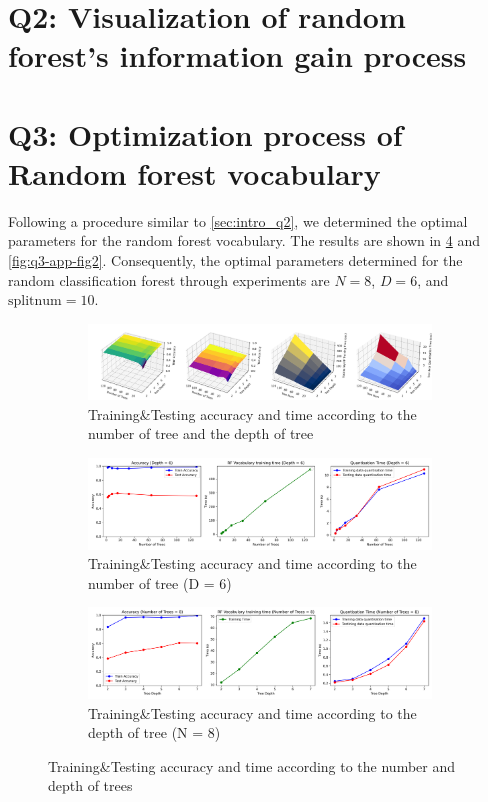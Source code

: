 \section{Q2: Visualization of random forest's information gain process}
\label{subsec:Q2-app2}


\section{Q3: Optimization process of Random forest vocabulary}
Following a procedure similar to \cref{sec:intro_q2}, we determined the optimal parameters for the random forest vocabulary. The results are shown in \cref{fig:q3-app-fig1} and \cref{fig:q3-app-fig2}. Consequently, the optimal parameters determined for the random classification forest through experiments are $N=8$, $D=6$, and $\text{splitnum}=10$.

\label{subsec:Q2-app3}
\begin{figure}[htbp]
	\centering
	\begin{subfigure}[H]{0.7\linewidth}
		\centering
		\includegraphics[width=\linewidth]{image/q3-fig1.png}
		\caption{Training\&Testing accuracy and time according to the number of tree and the depth of tree}
		\label{fig:q3-fig1}
	\end{subfigure}
	\begin{subfigure}[H]{0.7\linewidth}
		\centering
		\includegraphics[width=\linewidth]{image/q3-fig2.png}
		\caption{Training\&Testing accuracy and time according to the number of tree (D = 6)}
		\label{fig:q3-fig2}
	\end{subfigure}
	\begin{subfigure}[H]{0.7\linewidth}
		\centering
		\includegraphics[width=\linewidth]{image/q3-fig3.png}
		\caption{Training\&Testing accuracy and time according to the depth of tree (N = 8)}
		\label{fig:q3-fig3}
	\end{subfigure}
	\caption{Training\&Testing accuracy and time according to the number and depth of trees}
	\label{fig:q3-app-fig1}
\end{figure}



